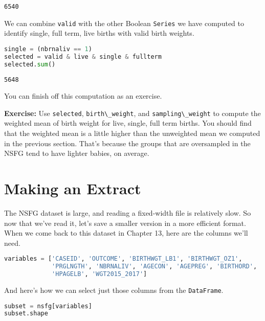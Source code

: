 \begin{lstlisting}[style=output]
6540
\end{lstlisting}

\pagebreak

We can combine \passthrough{\lstinline!valid!} with the other Boolean
\passthrough{\lstinline!Series!} we have computed to identify single,
full term, live births with valid birth weights.

\begin{lstlisting}[language=Python,style=source]
single = (nbrnaliv == 1)
selected = valid & live & single & fullterm
selected.sum()
\end{lstlisting}

\begin{lstlisting}[style=output]
5648
\end{lstlisting}

You can finish off this computation as an exercise.

\textbf{Exercise:} Use \passthrough{\lstinline!selected!},
\passthrough{\lstinline!birth\_weight!}, and
\passthrough{\lstinline!sampling\_weight!} to compute the weighted mean
of birth weight for live, single, full term births. You should find that
the weighted mean is a little higher than the unweighted mean we
computed in the previous section. That's because the groups that are
oversampled in the NSFG tend to have lighter babies, on average.

\section{Making an Extract}\label{making-an-extract}

The NSFG dataset is large, and reading a fixed-width file is relatively
slow. So now that we've read it, let's save a smaller version in a more
efficient format. When we come back to this dataset in Chapter 13, here
are the columns we'll need.


\begin{lstlisting}[language=Python,style=source]
variables = ['CASEID', 'OUTCOME', 'BIRTHWGT_LB1', 'BIRTHWGT_OZ1',
             'PRGLNGTH', 'NBRNALIV', 'AGECON', 'AGEPREG', 'BIRTHORD',
             'HPAGELB', 'WGT2015_2017']
\end{lstlisting}

And here's how we can select just those columns from the
\passthrough{\lstinline!DataFrame!}.

\begin{lstlisting}[language=Python,style=source]
subset = nsfg[variables]
subset.shape
\end{lstlisting}

